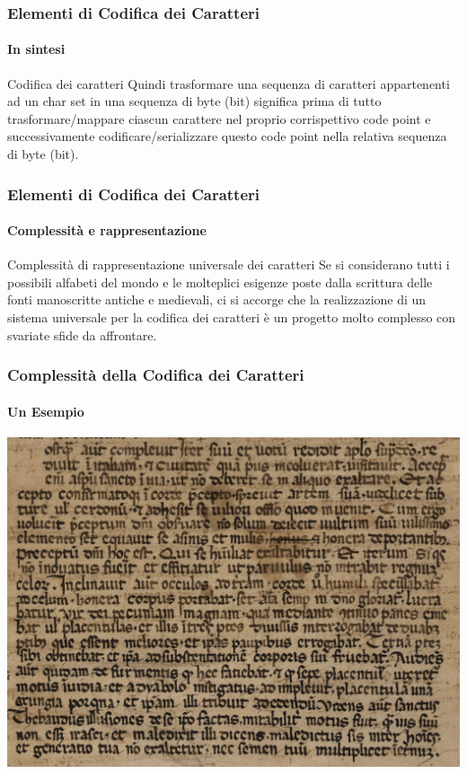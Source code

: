 \begin{frame}
	\frametitle{Elementi di Codifica dei Caratteri}
	\framesubtitle{In sintesi}
	\addtocounter{nframe}{1}


	\begin{block}{Codifica dei caratteri}
		Quindi trasformare una sequenza di caratteri appartenenti ad un char set in una sequenza di byte (bit) significa prima di tutto trasformare/mappare ciascun carattere nel proprio corrispettivo code point e successivamente codificare/serializzare questo code point nella relativa sequenza di byte (bit).
	\end{block}

\end{frame}


\begin{frame}
	\frametitle{Elementi di Codifica dei Caratteri}
	\framesubtitle{Complessità e rappresentazione}
	\addtocounter{nframe}{1}

	\begin{block}{Complessità di rappresentazione universale dei caratteri}
		Se si considerano tutti i possibili alfabeti del mondo e le molteplici esigenze poste dalla scrittura delle fonti manoscritte antiche e medievali, ci si accorge che la realizzazione di un sistema universale per la codifica dei caratteri è un progetto molto complesso con svariate sfide da affrontare.
	\end{block}

\end{frame}

\begin{frame}
	\frametitle{Complessità della Codifica dei Caratteri}
	\framesubtitle{Un Esempio}
	\addtocounter{nframe}{1}

	\begin{center}
		\includegraphics[width=.9\textwidth]{imgs/SnippetRotulo.jpg}
	\end{center}

\end{frame}

